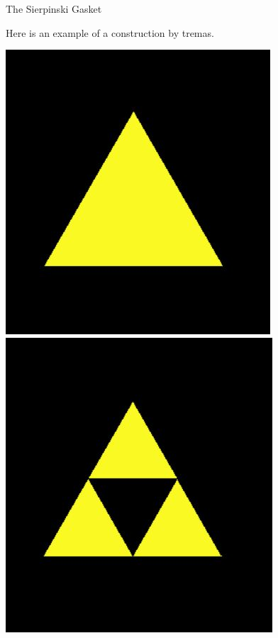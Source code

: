 \documentclass{beamer}
\begin{document}
\begin{frame}{The Sierpinski Gasket}
\begin{center}Here is an example of a construction by tremas.\\ \vspace{2em}\end{center}
\includegraphics[scale=.25]{gasket0.JPG} \hspace{1em}
\includegraphics[scale=.25]{gasket1.JPG} \hspace{1em}

\end{frame}
\end{document}

